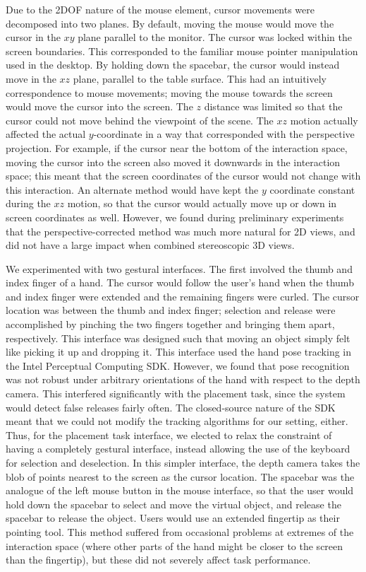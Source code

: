 \documentclass[pageno]{jpaper}
\begin{document}
Due to the 2DOF nature of the mouse element, cursor movements were decomposed into two planes.
By default, moving the mouse would move the cursor in the $xy$ plane parallel to the monitor.
The cursor was locked within the screen boundaries. This corresponded to the familiar mouse pointer
manipulation used in the desktop. By holding down the spacebar, the cursor would instead move in the
$xz$ plane, parallel to the table surface. This had an intuitively correspondence to mouse movements; moving
the mouse towards the screen would move the cursor into the screen. The $z$ distance was limited so that the
cursor could not move behind the viewpoint of the scene. The $xz$ motion actually affected the actual $y$-coordinate
in a way that corresponded with the perspective projection. For example, if the cursor near the bottom of the interaction
space, moving the cursor into the screen also moved it downwards in the interaction space; this meant that the screen
coordinates of the cursor would not change with this interaction. An alternate method would have kept the $y$ coordinate
constant during the $xz$ motion, so that the cursor would actually move up or down in screen coordinates as well. However,
we found during preliminary experiments that the perspective-corrected method was much more natural for 2D views, and did
not have a large impact when combined stereoscopic 3D views.

We experimented with two gestural interfaces. The first involved the thumb and index finger of a hand. The cursor would
follow the user's hand when the thumb and index finger were extended and the remaining fingers were curled. The cursor
location was between the thumb and index finger; selection and release were accomplished by pinching the two fingers
together and bringing them apart, respectively. This interface was designed such that moving an object simply felt like
picking it up and dropping it. This interface used the hand pose tracking in the Intel Perceptual Computing SDK.
However, we found that pose recognition
was not robust under arbitrary orientations of the hand with respect to the depth camera. This interfered significantly with
the placement task, since the system would detect false releases fairly often. The closed-source nature of the SDK meant that
we could not modify the tracking algorithms for our setting, either. Thus, for the placement task interface, we elected to
relax the constraint of having a completely gestural interface, instead allowing the use of the keyboard for selection and
deselection. In this simpler interface, the depth camera takes the blob of points nearest to the screen as the cursor location.
The spacebar was the analogue of the left mouse button in the mouse interface, so that the user would hold down the spacebar
to select and move the virtual object, and release the spacebar to release the object. Users would use an extended fingertip as
their pointing tool. This method suffered from occasional problems at extremes of the interaction space (where other parts of the hand
might be closer to the screen than the fingertip), but these did not severely affect task performance.
\end{document}
